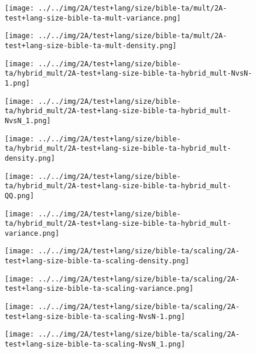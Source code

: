 \begin{figure}[H]
\centering	\texttt{[image: ../../img/2A/test+lang/size/bible-ta/mult/2A-test+lang-size-bible-ta-mult-variance.png]}
\end{figure}
\begin{figure}[H]
\centering	\texttt{[image: ../../img/2A/test+lang/size/bible-ta/mult/2A-test+lang-size-bible-ta-mult-density.png]}
\end{figure}
\begin{figure}[H]
\centering	\texttt{[image: ../../img/2A/test+lang/size/bible-ta/hybrid\_mult/2A-test+lang-size-bible-ta-hybrid\_mult-NvsN-1.png]}
\end{figure}
\begin{figure}[H]
\centering	\texttt{[image: ../../img/2A/test+lang/size/bible-ta/hybrid\_mult/2A-test+lang-size-bible-ta-hybrid\_mult-NvsN\_1.png]}
\end{figure}
\begin{figure}[H]
\centering	\texttt{[image: ../../img/2A/test+lang/size/bible-ta/hybrid\_mult/2A-test+lang-size-bible-ta-hybrid\_mult-density.png]}
\end{figure}
\begin{figure}[H]
\centering	\texttt{[image: ../../img/2A/test+lang/size/bible-ta/hybrid\_mult/2A-test+lang-size-bible-ta-hybrid\_mult-QQ.png]}
\end{figure}
\begin{figure}[H]
\centering	\texttt{[image: ../../img/2A/test+lang/size/bible-ta/hybrid\_mult/2A-test+lang-size-bible-ta-hybrid\_mult-variance.png]}
\end{figure}
\begin{figure}[H]
\centering	\texttt{[image: ../../img/2A/test+lang/size/bible-ta/scaling/2A-test+lang-size-bible-ta-scaling-density.png]}
\end{figure}
\begin{figure}[H]
\centering	\texttt{[image: ../../img/2A/test+lang/size/bible-ta/scaling/2A-test+lang-size-bible-ta-scaling-variance.png]}
\end{figure}
\begin{figure}[H]
\centering	\texttt{[image: ../../img/2A/test+lang/size/bible-ta/scaling/2A-test+lang-size-bible-ta-scaling-NvsN-1.png]}
\end{figure}
\begin{figure}[H]
\centering	\texttt{[image: ../../img/2A/test+lang/size/bible-ta/scaling/2A-test+lang-size-bible-ta-scaling-NvsN\_1.png]}
\end{figure}
